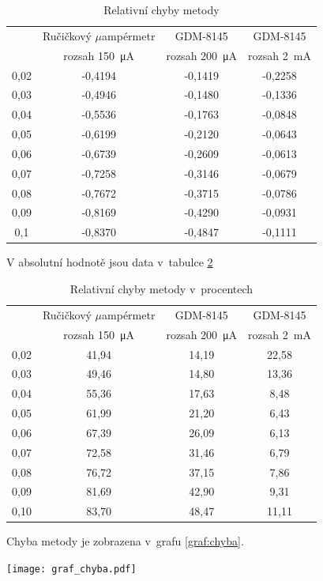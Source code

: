 \documentclass[a4paper,12pt]{article}   %
\newcommand{\tmu}{$\mu$}
\begin{document}
\begin{table}[h!]
    \centering
    \begin{tabular}{|c|c|c|c|}
        \hline
        \rule{0pt}{2.5ex}
        \multirow{2}{*}{Napětí na děliči} &Ručičkový \tmu ampérmetr	&GDM-8145 	&GDM-8145 \\[.7ex]
        & rozsah  150~μA & rozsah 200~μA & rozsah  2~mA \\\hline\hline
        0,02 & -0,4194 & -0,1419 & -0,2258 \\\hline
        0,03 & -0,4946 & -0,1480 & -0,1336 \\\hline 
        0,04 & -0,5536 & -0,1763 & -0,0848 \\\hline 
        0,05 & -0,6199 & -0,2120 & -0,0643 \\\hline
        0,06 & -0,6739 & -0,2609 & -0,0613 \\\hline
        0,07 & -0,7258 & -0,3146 & -0,0679 \\\hline
        0,08 & -0,7672 & -0,3715 & -0,0786 \\\hline
        0,09 & -0,8169 & -0,4290 & -0,0931 \\\hline
        0,1  & -0,8370 & -0,4847 & -0,1111 \\\hline
    \end{tabular}
    \caption{Relativní chyby metody}
    \label{tab:rel}
\end{table}
V absolutní hodnotě jsou data v~tabulce \ref{tab:rel_percent}
\begin{table}[h!]
    \centering
    \begin{tabular}{|c|c|c|c|}
        \hline
        \rule{0pt}{2.5ex}
        \multirow{2}{*}{Napětí na děliči} &Ručičkový \tmu ampérmetr	&GDM-8145 	&GDM-8145 \\[.7ex]
        & rozsah  150~μA & rozsah 200~μA & rozsah  2~mA \\\hline\hline
        0,02&41,94&14,19&22,58  \\\hline
        0,03&49,46&14,80&13,36  \\\hline
        0,04&55,36&17,63&8,48   \\\hline
        0,05&61,99&21,20&6,43   \\\hline
        0,06&67,39&26,09&6,13   \\\hline
        0,07&72,58&31,46&6,79   \\\hline
        0,08&76,72&37,15&7,86   \\\hline
        0,09&81,69&42,90&9,31   \\\hline
        0,10&83,70&48,47&11,11  \\\hline
    \end{tabular}
    \caption{Relativní chyby metody v~procentech}
    \label{tab:rel_percent}
\end{table}
Chyba metody je zobrazena v~grafu \ref{graf:chyba}.
\begin{graf}
    \centering
    \texttt{[image: graf\_chyba.pdf]}
    \caption{Relativní chyba metody v~závislosti na měřeném napětí}
    \label{graf:chyba}
\end{graf}
\end{document}
